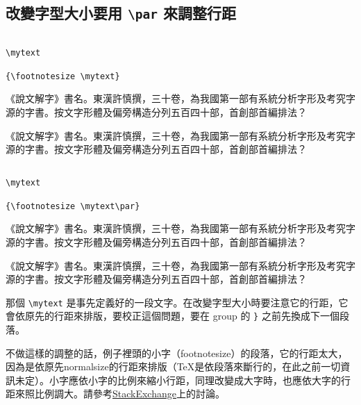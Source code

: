 \subsection{改變字型大小要用 \texttt{\textbackslash par} 來調整行距}

\def\mytext{%
《說文解字》書名。東漢許慎撰，三十卷，為我國第一部有系統分析字形及考究字源的字書。按文字形體及偏旁構造分列五百四十部，首創部首編排法？}

\begin{Wrong}
\begin{verbatim}

\mytext

{\footnotesize \mytext}

\end{verbatim}
\mytext

{\footnotesize \mytext}
\end{Wrong}

\begin{Right}
\begin{verbatim}

\mytext

{\footnotesize \mytext\par}

\end{verbatim}
\mytext

{\footnotesize \mytext\par}
\end{Right}

那個 \verb|\mytext| 是事先定義好的一段文字。在改變字型大小時要注意它的行距，它會依原先的行距來排版，要校正這個問題，要在 group 的 \verb|}| 之前先換成下一個段落。

不做這樣的調整的話，例子裡頭的小字（footnotesize）的段落，它的行距太大，因為是依原先normalsize的行距來排版（\TeX 是依段落來斷行的，在此之前一切資訊未定）。小字應依小字的比例來縮小行距，同理改變成大字時，也應依大字的行距來照比例調大。請參考\href{https://tex.stackexchange.com/questions/444039/why-do-i-have-to-use-par-if-i-change-font-size-withing-a-group-scope}{\textsf{StackExchange}}上的討論。

\marginpar{\back}
